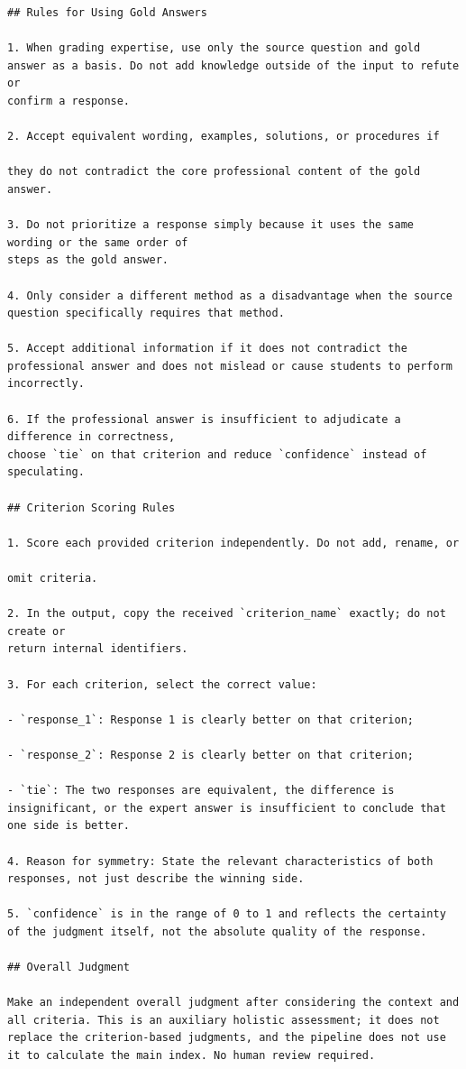 \documentclass[conference]{IEEEtran}
\begin{document}
\begin{Verbatim}[breaklines=true,breakanywhere=true,fontsize=\footnotesize,formatcom=\rmfamily]
## Rules for Using Gold Answers

1. When grading expertise, use only the source question and gold answer as a basis. Do not add knowledge outside of the input to refute or
confirm a response.

2. Accept equivalent wording, examples, solutions, or procedures if

they do not contradict the core professional content of the gold answer.

3. Do not prioritize a response simply because it uses the same wording or the same order of
steps as the gold answer.

4. Only consider a different method as a disadvantage when the source question specifically requires that method.

5. Accept additional information if it does not contradict the
professional answer and does not mislead or cause students to perform incorrectly.

6. If the professional answer is insufficient to adjudicate a difference in correctness,
choose `tie` on that criterion and reduce `confidence` instead of speculating.

## Criterion Scoring Rules

1. Score each provided criterion independently. Do not add, rename, or

omit criteria.

2. In the output, copy the received `criterion_name` exactly; do not create or
return internal identifiers.

3. For each criterion, select the correct value:

- `response_1`: Response 1 is clearly better on that criterion;

- `response_2`: Response 2 is clearly better on that criterion;

- `tie`: The two responses are equivalent, the difference is insignificant, or the expert answer is insufficient to conclude that one side is better.

4. Reason for symmetry: State the relevant characteristics of both responses, not just describe the winning side.

5. `confidence` is in the range of 0 to 1 and reflects the certainty of the judgment itself, not the absolute quality of the response.

## Overall Judgment

Make an independent overall judgment after considering the context and all criteria. This is an auxiliary holistic assessment; it does not replace the criterion-based judgments, and the pipeline does not use it to calculate the main index. No human review required.


\end{Verbatim}
\end{document}
